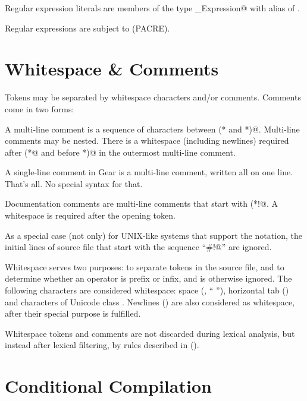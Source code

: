 Regular expression literals are members of the type \lstinline@Regular_Expression@ with alias of \lstinline@Regexp@. 

Regular expressions are subject to  (PACRE). 





\section{Whitespace \& Comments}
\label{sec:whitespacecomments}

Tokens may be separated by whitespace characters and/or comments. Comments come in two forms: 

A multi-line comment is a sequence of characters between \lstinline@(* and *)@. Multi-line comments may be nested. There is a whitespace (including newlines) required after \lstinline@(*@ and before \lstinline@*)@ in the outermost multi-line comment. 

A single-line comment in Gear is a multi-line comment, written all on one line. That's all. No special syntax for that. 

Documentation comments are multi-line comments that start with \lstinline@(*!@. A whitespace is required after the opening token. 

As a special case (not only) for UNIX-like systems that support the notation, the initial lines of source file that start with the sequence ``\lstinline@#!@'' are ignored. 

Whitespace serves two purposes: to separate tokens in the source file, and to determine whether an operator is prefix or infix, and is otherwise ignored. The following characters are considered whitespace: space (, `` ''), horizontal tab () and characters of Unicode class . Newlines () are also considered as whitespace, after their special purpose is fulfilled. 

Whitespace tokens and comments are not discarded during lexical analysis, but instead after lexical filtering, by rules described in ().





\section{Conditional Compilation}
\label{sec:conditional-compilation}

